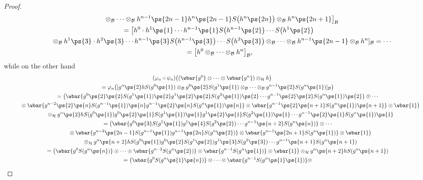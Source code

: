 \begin{proof}
\begin{gather*}
\qquad\phantom{=}{}
\otimes_{\cal B}\cdots \otimes_{\cal B} h^{n-1}\ps{2n-1}h^n\ps{2n-1}S\big(h^n\ps{2n}\big)\otimes_{\cal B} h^n\ps{2n+1}\big]_{\cal B}
\\
\qquad
=\big[h^0\cdot h^1\ps{1}\cdots h^{n-1}\ps{1}S\big(h^{n-1}\ps{2}\big)\cdots S\big(h^1\ps{2}\big)
\\
\qquad\phantom{=}{}
\otimes_{\cal B}
h^1\ps{3}\cdot h^2\ps{3}\cdots h^{n-1}\ps{3}S\big(h^{n-1}\ps{3}\big)\cdots S\big(h^2\ps{3}\big)\otimes_{\cal B}
\cdots \otimes_{\cal B} h^{n-1}\ps{2n-1}\otimes_{\cal B} h^n]_{\cal B} =\cdots
\\
\qquad{}
=\big[h^0\otimes_{\cal B}\cdots\otimes_{\cal B} h^n\big]_{\cal B},
\end{gather*}
while on the other hand
\begin{gather*}
(\varphi_n \circ \psi_n)\big((\wbar{g^0}\otimes\cdots\otimes \wbar{g^n})\otimes_{\cal H} h \big)
\\
\qquad
=\varphi_n\big([g^n\ps{2}hS(g^0\ps{1}) \otimes_{\cal B} g^0\ps{2}S(g^1\ps{1}) \otimes_{\cal B} \cdots \otimes_{\cal B}
g^{n-1}\ps{2}S(g^n\ps{1})]_{\cal B} \big)
\\
\qquad
=\big(\wbar{g^0\ps{2}\ps{2}S(g^1\ps{1})\ps{2}g^1\ps{2}\ps{2}S(g^2\ps{1})\ps{2} \cdots
g^{n-1}\ps{2}\ps{2}S(g^n\ps{1})\ps{2}} \otimes \cdots
\\
\qquad
\phantom{=}{}
\otimes \wbar{g^{n-2}\ps{2}\ps{n}S(g^{n-1}\ps{1})\ps{n}g^{n-1}\ps{2}\ps{n}S(g^n\ps{1})\ps{n}}\otimes
\wbar{g^{n-1}\ps{2}\ps{n+1}S(g^n\ps{1})\ps{n+1}} \otimes \wbar{1}\big)
\\
\qquad\phantom{=}{}\otimes_{\cal H}
g^n\ps{2}hS(g^0\ps{1})g^0\ps{2}\ps{1}S(g^1\ps{1})\ps{1}g^1\ps{2}\ps{1}S(g^2\ps{1})\ps{1}\cdots
g^{n-1}\ps{2}\ps{1}S(g^n\ps{1})\ps{1}
\\
\qquad
=\big(\wbar{g^0\ps{3}S(g^1\ps{1})g^1\ps{4}S(g^2\ps{2}) \cdots g^{n-1}\ps{n+2}S(g^n\ps{n})} \otimes \cdots
\\
\qquad
\phantom{=}
\otimes \wbar{g^{n-2}\ps{2n-1}S(g^{n-1}\ps{1})g^{n-1}\ps{2n}S(g^n\ps{2})}\otimes
\wbar{g^{n-1}\ps{2n+1}S(g^n\ps{1})} \otimes \wbar{1}\big)
\\
\qquad\phantom{=}\otimes_{\cal H}
g^n\ps{n+2}hS(g^0\ps{1})g^0\ps{2}S(g^1\ps{2})g^1\ps{3}S(g^2\ps{3})\cdots g^{n-1}\ps{n+1}S(g^n\ps{n+1})
\\
\qquad
=\big(\wbar{g^0S(g^n\ps{n})} \otimes \cdots\otimes \wbar{g^{n-2}S(g^n\ps{2})}\otimes \wbar{g^{n-1}S(g^n\ps{1})} \otimes
\wbar{1}\big)\otimes_{\cal H} g^n\ps{n+2}hS(g^n\ps{n+1})
\\
\qquad
=\big(\wbar{g^0S(g^n\ps{1}\ps{n})} \otimes\cdots\otimes \wbar{g^{n-1}S(g^n\ps{1}\ps{1})}\otimes

\end{gather*}
\end{proof}
